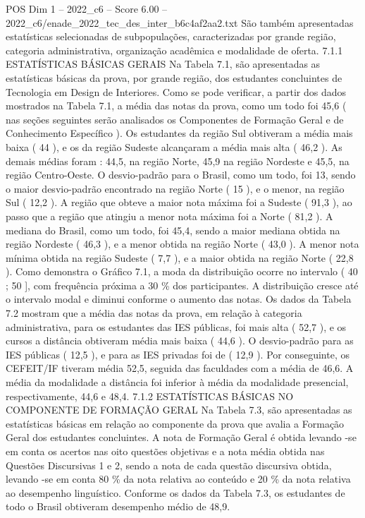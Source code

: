 \begin{textsample}{POS Dim 1 – 2022\_c6 – Score 6.00 – 2022\_c6/enade\_2022\_tec\_des\_inter\_b6c4af2aa2.txt}
São também apresentadas estatísticas selecionadas de subpopulações, caracterizadas por grande região, categoria administrativa, organização acadêmica e modalidade de oferta. 7.1.1 ESTATÍSTICAS BÁSICAS GERAIS Na Tabela 7.1, são apresentadas as estatísticas básicas da prova, por grande região, dos estudantes concluintes de Tecnologia em Design de Interiores.
Como se pode verificar, a partir dos dados mostrados na Tabela 7.1, a média das notas da prova, como um todo foi 45,6 ( nas seções seguintes serão analisados os Componentes de Formação Geral e de Conhecimento Específico ).
Os estudantes da região Sul obtiveram a média mais baixa ( 44 ), e os da região Sudeste alcançaram a média mais alta ( 46,2 ).
As demais médias foram : 44,5, na região Norte, 45,9 na região Nordeste e 45,5, na região Centro-Oeste.
O desvio-padrão para o Brasil, como um todo, foi 13, sendo o maior desvio-padrão encontrado na região Norte ( 15 ), e o menor, na região Sul ( 12,2 ).
A região que obteve a maior nota máxima foi a Sudeste ( 91,3 ), ao passo que a região que atingiu a menor nota máxima foi a Norte ( 81,2 ).
A mediana do Brasil, como um todo, foi 45,4, sendo a maior mediana obtida na região Nordeste ( 46,3 ), e a menor obtida na região Norte ( 43,0 ).
A menor nota mínima obtida na região Sudeste ( 7,7 ), e a maior obtida na região Norte ( 22,8 ).
Como demonstra o Gráfico 7.1, a moda da distribuição ocorre no intervalo ( 40 ; 50 ], com frequência próxima a 30 \% dos participantes.
A distribuição cresce até o intervalo modal e diminui conforme o aumento das notas.
Os dados da Tabela 7.2 mostram que a média das notas da prova, em relação à categoria administrativa, para os estudantes das IES públicas, foi mais alta ( 52,7 ), e os cursos a distância obtiveram média mais baixa ( 44,6 ).
O desvio-padrão para as IES públicas ( 12,5 ), e para as IES privadas foi de ( 12,9 ).
Por conseguinte, os CEFEIT/IF tiveram média 52,5, seguida das faculdades com a média de 46,6.
A média da modalidade a distância foi inferior à média da modalidade presencial, respectivamente, 44,6 e 48,4. 7.1.2 ESTATÍSTICAS BÁSICAS NO COMPONENTE DE FORMAÇÃO GERAL Na Tabela 7.3, são apresentadas as estatísticas básicas em relação ao componente da prova que avalia a Formação Geral dos estudantes concluintes.
A nota de Formação Geral é obtida levando -se em conta os acertos nas oito questões objetivas e a nota média obtida nas Questões Discursivas 1 e 2, sendo a nota de cada questão discursiva obtida, levando -se em conta 80 \% da nota relativa ao conteúdo e 20 \% da nota relativa ao desempenho linguístico.
Conforme os dados da Tabela 7.3, os estudantes de todo o Brasil obtiveram desempenho médio de 48,9.

\end{textsample}
